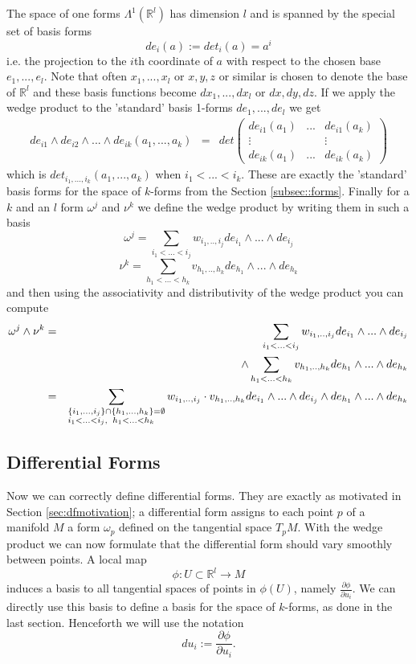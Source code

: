  The space of one forms $\Lambda^1(\mathbb R^l)$ has dimension $l$ and is spanned by the special set of basis forms
\[de_i(a) := det_i(a) = a^i\]
i.e. the projection to the $i$th coordinate of $a$ with respect to the chosen base $e_1,...,e_l$. Note that often $x_1,...,x_l$ or $x,y,z$ or similar is chosen to denote the base of $\mathbb R^l$ and these basis functions become $dx_1,..., dx_l$ or $dx,dy,dz$. If we apply the wedge product to the 'standard' basis 1-forms $de_1,..., de_l$ we get
\begin{eqnarray*}de_{i1}\wedge de_{i2} \wedge ... \wedge de_{ik}(a_1,...,a_k) &= &det \begin{pmatrix}
de_{i1}(a_1) &  ... & de_{i1}(a_k) \\
\vdots & & \vdots \\
de_{ik}(a_1) &... & de_{ik}(a_k)
\end{pmatrix} \end{eqnarray*}
which is $det_{i_1,...,i_k}(a_1,...,a_k)$ when $i_1 <...<i_k$. These are exactly the 'standard' basis forms for the space of $k$-forms from the Section \ref{subsec::forms}. Finally for a $k$ and an $l$ form $\omega^j$ and $\nu^k$ we define the wedge product by writing them in such a basis
\[\omega^j = \sum_{i_1<...<i_j} w_{i_1,..,i_j} de_{i_1}\wedge...\wedge de_{i_j} \]
\[\nu^k = \sum_{h_1<...<h_k} v_{h_1,..,h_k} de_{h_1}\wedge...\wedge de_{h_k} \]
and then using the associativity and distributivity of the wedge product you can compute
\begin{eqnarray*}
\omega^j\wedge \nu^k &=& \sum_{i_1<...<i_j} w_{i_1,..,i_j} de_{i_1}\wedge...\wedge de_{i_j} \\
& & \wedge \sum_{h_1<...<h_k} v_{h_1,..,h_k} de_{h_1}\wedge...\wedge de_{h_k} \\
& =& \sum_{\begin{subarray}
\{\{ i_1,...,i_j\}\cap \{h_1,...,h_k\} = \emptyset \\
i_1 < ... < i_j,\;\; h_1 <...<h_k
\end{subarray}} w_{i_1,..,i_j} \cdot v_{h_1,..,h_k} de_{i_1}\wedge...\wedge de_{i_j} \wedge de_{h_1}\wedge...\wedge de_{h_k}
\end{eqnarray*}

\subsection{Differential Forms}
\label{subsec:defDiffform}
Now we can correctly define differential forms. They are exactly as motivated in Section \ref{sec:dfmotivation}; a differential form assigns to each point $p$ of a manifold $M$ a form $\omega_p$ defined on the tangential space $T_pM$. With the wedge product we can now formulate that the differential form should vary smoothly between points. A local map 
\[\phi:  U \subset\mathbb R^l \to M\] 
induces a basis to all tangential spaces of points in $\phi(U)$, namely $\frac{\partial \phi}{\partial u_i}$. We can directly use this basis to define a basis for the space of $k$-forms, as done in the last section. Henceforth we will use the notation 
\[d u_i:=\frac{\partial \phi}{\partial u_i}.\]

